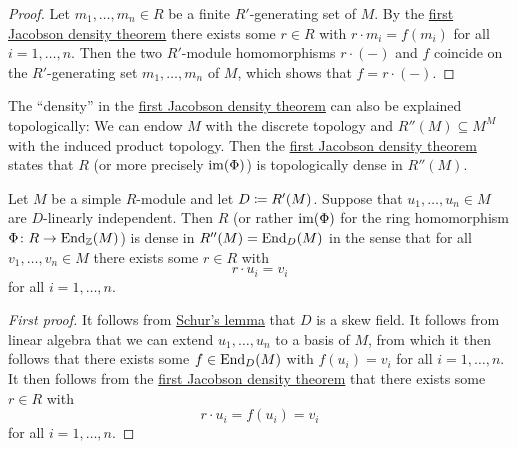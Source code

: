 \begin{proof}
  Let $m_1, \dotsc, m_n \in R$ be a finite $R'$-generating set of $M$.
  By the \hyperref[theorem: first jacobson density theorem]{first Jacobson density theorem} there exists some $r \in R$ with $r \cdot m_i = f(m_i)$ for all $i = 1, \dotsc, n$.
  Then the two $R'$-module homomorphisms $r \cdot (-)$ and $f$ coincide on the $R'$-generating set $m_1, \dotsc, m_n$ of $M$, which shows that $f = r \cdot (-)$.
\end{proof}


\begin{remark}
  The \enquote{density} in the \hyperref[theorem: first jacobson density theorem]{first Jacobson density theorem} can also be explained topologically:
  We can endow $M$ with the discrete topology and $R''(M) \subseteq M^M$ with the induced product topology.
  Then the \hyperref[theorem: first jacobson density theorem]{first Jacobson density theorem} states that $R$ (or more precisely $\operatorname{im}(\Phi)$) is topologically dense in $R''(M)$.
\end{remark}


\begin{theorem}
  \label{theorem: second jacobson density theorem}
  Let $M$ be a simple $R$-module and let $D \coloneqq R'(M)$.
  Suppose that $u_1, \dotsc, u_n \in M$ are $D$-linearly independent.
  Then $R$ (or rather $\operatorname{im}(\Phi)$ for the ring homomorphism $\Phi \colon R \to \operatorname{End}_{\mathbb{Z}}(M)$) is dense in $R''(M) = \operatorname{End}_D(M)$ in the sense that for all $v_1, \dotsc, v_n \in M$ there exists some $r \in R$ with
  \[
    r \cdot u_i = v_i
  \]
  for all $i = 1, \dotsc, n$.
\end{theorem}


\begin{proof}[First proof]
  It follows from \hyperref[proposition: schurs lemma for modules]{Schur’s lemma} that $D$ is a skew field.
  It follows from linear algebra that we can extend $u_1, \dotsc, u_n$ to a basis of $M$, from which it then follows that there exists some $f \in \operatorname{End}_D(M)$ with $f(u_i) = v_i$ for all $i = 1, \dotsc, n$.
  It then follows from the \hyperref[theorem: first jacobson density theorem]{first Jacobson density theorem} that there exists some $r \in R$ with
  \[
      r \cdot u_i
    = f(u_i)
    = v_i
  \]
  for all $i = 1, \dotsc, n$.
\end{proof}


